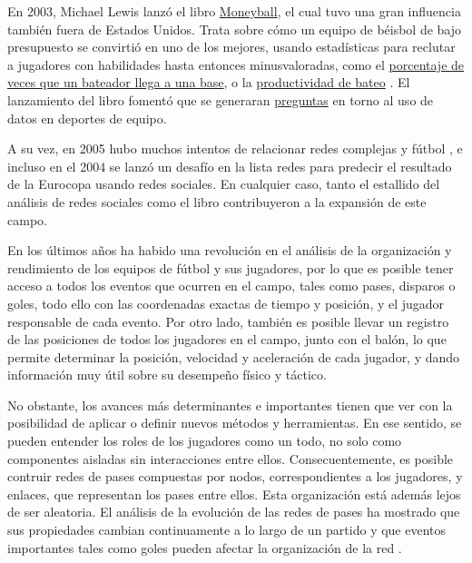 En 2003, Michael Lewis lanzó el libro \href{https://en.wikipedia.org/wiki/Moneyball}{Moneyball}, el cual tuvo una gran 
influencia también fuera de Estados Unidos. Trata sobre cómo
un equipo de béisbol de bajo presupuesto se convirtió en uno de los mejores, usando estadísticas para reclutar a jugadores 
con habilidades hasta entonces minusvaloradas, como el \href{https://en.wikipedia.org/wiki/On-base_percentage}{porcentaje de veces que un bateador llega a una base}, o 
la \href{https://en.wikipedia.org/wiki/Slugging_percentage}{productividad de bateo} \cite{moneyball-ev}. El lanzamiento del 
libro fomentó que se generaran \href{https://thesportjournal.org/article/an-examination-of-the-moneyball-theory-a-baseball-statistical-analysis/}{preguntas} en torno al uso de datos en deportes de equipo. 

A su vez, en 2005 hubo muchos intentos de relacionar redes complejas y fútbol \cite{lee2005passes}, 
e incluso en el 2004 se lanzó un desafío en la lista redes \cite{Bundio_Matías_2008} para predecir el resultado de la Eurocopa usando 
redes sociales. En cualquier caso, tanto el estallido del análisis de redes sociales como el libro contribuyeron 
a la expansión de este campo.

En los últimos años ha habido una revolución en el análisis de la organización 
y rendimiento de los equipos de fútbol y sus jugadores, por lo que es posible tener acceso a todos los 
eventos que ocurren en el campo, tales como pases, disparos o goles, todo ello con las coordenadas 
exactas de tiempo y posición, y el jugador responsable de cada evento. Por otro lado, también es 
posible llevar un registro de las posiciones de todos los jugadores en el campo, junto con el balón, 
lo que permite determinar la posición, velocidad y aceleración de cada jugador, y dando información 
muy útil sobre su desempeño físico y táctico. 

No obstante, los avances más determinantes e importantes tienen que ver con la posibilidad de aplicar o 
definir nuevos métodos y herramientas. En ese sentido, se pueden entender los roles de los jugadores 
como un todo, no solo como componentes aisladas sin interacciones entre ellos. Consecuentemente, es 
posible contruir redes de pases compuestas por nodos, correspondientes a los jugadores, y enlaces, 
que representan los pases entre ellos. Esta organización está además lejos de ser 
aleatoria. El análisis de la evolución de las redes de pases ha mostrado que sus propiedades 
cambian continuamente a lo largo de un partido y que eventos importantes tales como goles 
pueden afectar la organización de la red \cite{spatial-and-temporal-entropies}.

